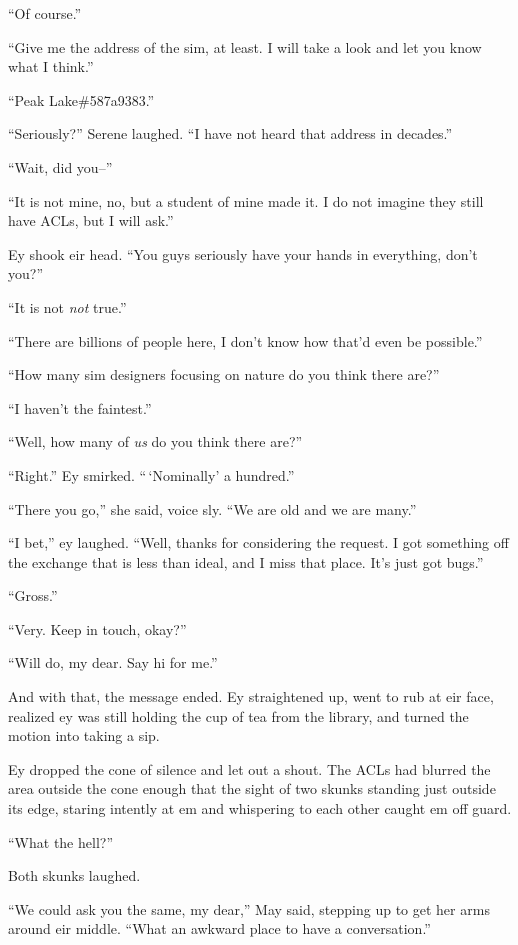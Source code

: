 ``Of course.''

``Give me the address of the sim, at least. I will take a look and let you know what I think.''

``Peak Lake\#587a9383.''

``Seriously?'' Serene laughed. ``I have not heard that address in decades.''

``Wait, did you--''

``It is not mine, no, but a student of mine made it. I do not imagine they still have ACLs, but I will ask.''

Ey shook eir head. ``You guys seriously have your hands in everything, don't you?''

``It is not \emph{not} true.''

``There are billions of people here, I don't know how that'd even be possible.''

``How many sim designers focusing on nature do you think there are?''

``I haven't the faintest.''

``Well, how many of \emph{us} do you think there are?''

``Right.'' Ey smirked. ``\,`Nominally' a hundred.''

``There you go,'' she said, voice sly. ``We are old and we are many.''

``I bet,'' ey laughed. ``Well, thanks for considering the request. I got something off the exchange that is less than ideal, and I miss that place. It's just got bugs.''

``Gross.''

``Very. Keep in touch, okay?''

``Will do, my dear. Say hi for me.''

And with that, the message ended. Ey straightened up, went to rub at eir face, realized ey was still holding the cup of tea from the library, and turned the motion into taking a sip.

Ey dropped the cone of silence and let out a shout. The ACLs had blurred the area outside the cone enough that the sight of two skunks standing just outside its edge, staring intently at em and whispering to each other caught em off guard.

``What the hell?''

Both skunks laughed.

``We could ask you the same, my dear,'' May said, stepping up to get her arms around eir middle. ``What an awkward place to have a conversation.''

